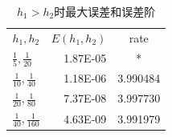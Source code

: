 \documentclass[withoutpreface,bwprint]{cumcmthesis} %
\begin{document}
	\begin{table}[htbp]
		\centering
		\caption{$h_{1}>h_{2}$时最大误差和误差阶}
		\begin{tabular}{lrc}
			\toprule[1.5pt]
			\multicolumn{1}{c}{\multirow{2}[0]{*}{$h_{1},h_{2}$}} & \multicolumn{1}{c}{\multirow{2}[0]{*}{$E(h_{1},h_{2})$}} & \multirow{2}[0]{*}{rate} \\
			&       &  \\
			\midrule[1pt]
			$\frac{1}{5},\frac{1}{20}$ & 1.87E-05 & * \\
			$\frac{1}{10},\frac{1}{40}$ & 1.18E-06 & 3.990484  \\
			$\frac{1}{20},\frac{1}{80}$ & 7.37E-08 & 3.997730  \\
			$\frac{1}{40},\frac{1}{160}$ & 4.63E-09 & 3.991979  \\
			\bottomrule[1.5pt]
		\end{tabular}%
		\label{tab:4}%
	\end{table}%
	
	
\end{document}
